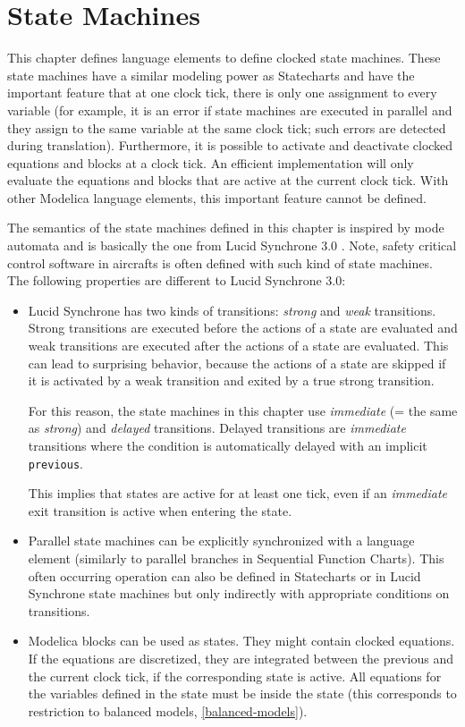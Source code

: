 \chapter{State Machines}\label{state-machines}

This chapter defines language elements to define clocked state machines.
These state machines have a similar modeling power as Statecharts \parencite{Harel1987Statecharts} and have the important feature that at one clock tick, there is only one assignment to every variable (for example, it is an error if state machines are executed in parallel and they assign to the same variable at the same clock tick; such errors are detected during translation).
Furthermore, it is possible to activate and deactivate clocked equations and blocks at a clock tick.
An efficient implementation will only evaluate the equations and blocks that are active at the current clock tick.
With other Modelica language elements, this important feature cannot be defined.

The semantics of the state machines defined in this chapter is inspired by mode automata and is basically the one from Lucid Synchrone 3.0 \parencite{Pouzet2006LucidSynchrone30}.
Note, safety critical control software in aircrafts is often defined with such kind of state machines.
The following properties are different to Lucid Synchrone 3.0:
\begin{itemize}
\item
  Lucid Synchrone has two kinds of transitions: \emph{strong} and \emph{weak} transitions.
  Strong transitions are executed before the actions of a state are evaluated and weak transitions are executed after the actions of a state are evaluated.
  This can lead to surprising behavior, because the actions of a state are skipped if it is activated by a weak transition and exited by a true strong transition.

  For this reason, the state machines in this chapter use \emph{immediate} (= the same as \emph{strong}) and \emph{delayed} transitions.
  Delayed transitions are \emph{immediate} transitions where the condition is automatically delayed with an implicit \lstinline!previous!.

  This implies that states are active for at least one tick, even if an \emph{immediate} exit transition is active when entering the state.
\item
  Parallel state machines can be explicitly synchronized with a language element (similarly to parallel branches in Sequential Function Charts).
  This often occurring operation can also be defined in Statecharts or in Lucid Synchrone state machines but only indirectly with appropriate conditions on transitions.
\item
  Modelica blocks can be used as states.
  They might contain clocked equations.
  If the equations are discretized, they are integrated between the previous and the current clock tick, if the corresponding state is active.
  All equations for the variables defined in the state must be inside the state (this corresponds to restriction to balanced models, \cref{balanced-models}).
\end{itemize}

